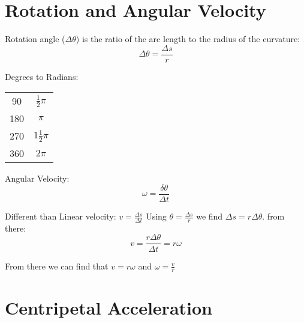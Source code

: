 \documentclass{article}
\begin{document}
\section{Rotation and Angular Velocity}
Rotation angle ($\Delta \theta$) is the ratio of the arc length to the radius of the curvature:\[\Delta \theta = \frac{\Delta s}{r} \]

Degrees to Radians:
\begin{center}
  \begin{tabular}{ |c|c| }
    \hline
    90 & $\frac{1}{2} \pi$ \\
    180 & $\pi$ \\
    270 & $ 1 \frac{1}{2} \pi$ \\
    360 & $ 2 \pi $ \\
    \hline
  \end{tabular}
 \end{center}

 Angular Velocity: \[ \omega = \frac{\delta \theta}{\Delta t} \]

 Different than Linear velocity: $v = \frac{\Delta s}{\Delta t}$
 Using $\theta = \frac{\Delta s}{r}$ we find $\Delta s = r \Delta \theta$. from there: \[ v = \frac{r \Delta \theta}{\Delta t} = r \omega \]

 From there we can find that $ v = r \omega $ and $ \omega = \frac {v}{r} $



 \section {Centripetal Acceleration}
\end{document}
